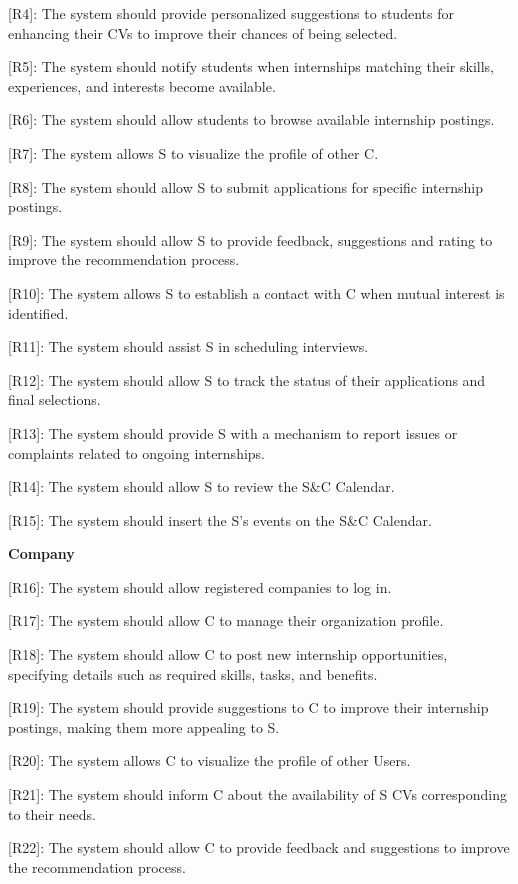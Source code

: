 {[}R4{]}: The system should provide personalized suggestions to students
for enhancing their CVs to improve their chances of being selected.

{[}R5{]}: The system should notify students when internships matching
their skills, experiences, and interests become available.

{[}R6{]}: The system should allow students to browse available
internship postings.

{[}R7{]}: The system allows S to visualize the profile of other C.~

{[}R8{]}: The system should allow S to submit applications for specific
internship postings.~

{[}R9{]}: The system should allow S to provide feedback, suggestions and
rating to improve the recommendation process.

{[}R10{]}: The system allows S to establish a contact with C when mutual
interest is identified.

{[}R11{]}: The system should assist S in scheduling interviews.

{[}R12{]}: The system should allow S to track the status of their
applications and final selections.

{[}R13{]}: The system should provide S with a mechanism to report issues
or complaints related to ongoing internships.~

{[}R14{]}: The system should allow S to review the S\&C Calendar.

{[}R15{]}: The system should insert the S's events on the S\&C Calendar.

\textbf{Company}

{[}R16{]}: The system should allow registered companies to log in.

{[}R17{]}: The system should allow C to manage their organization
profile.

{[}R18{]}: The system should allow C to post new internship
opportunities, specifying details such as required skills, tasks, and
benefits.

{[}R19{]}: The system should provide suggestions to C to improve their
internship postings, making them more appealing to S.

{[}R20{]}: The system allows C to visualize the profile of other Users.

{[}R21{]}: The system should inform C about the availability of S CVs
corresponding to their needs.

{[}R22{]}: The system should allow C to provide feedback and suggestions
to improve the recommendation process.


